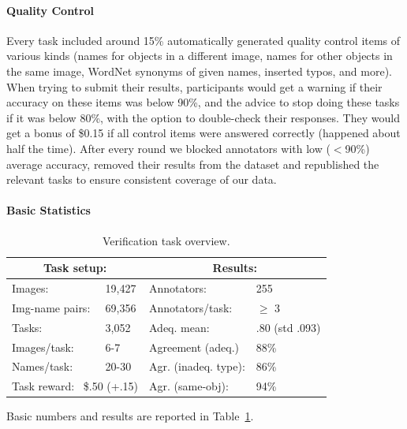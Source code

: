 \documentclass[11pt,a4paper]{article}
\begin{document}
\paragraph{Quality Control}
Every task included around 15\% automatically generated quality control items of various kinds (names for objects in a different image, names for other objects in the same image, WordNet synonyms of given names, inserted typos, and more).
When trying to submit their results, participants would get a warning if their accuracy on these items was below 90\%, and the advice to stop doing these tasks if it was below 80\%, with the option to double-check their responses.
They would get a bonus of \$0.15 if all control items were answered correctly (happened about half the time).
After every round we blocked annotators with low ($<$90\%) average accuracy, removed their results from the dataset and republished the relevant tasks to ensure consistent coverage of our data.

\paragraph{Basic Statistics}
\begin{table}[t]
	\centering
	\small
	\begin{tabular}{|ll|ll|}
		\hline
		\multicolumn{2}{|c|}{\textbf{Task setup:}} & \multicolumn{2}{c|}{\textbf{Results:}} \\ \hline
		Images: & 19,427 &
		Annotators: & 255 \\
		Img-name pairs: & 69,356 &
		Annotators/task: & $\geq$ 3 \\
		Tasks: & 3,052 &
		Adeq. mean: & \hspace{-3em}.80 (std .093)\\
		Images/task: & 6-7 &			
		Agreement (adeq.) & 88\% \\ 
		Names/task: & 20-30 &
		Agr. (inadeq. type): & 86\% \\
		\multicolumn{2}{|l|}{Task reward: \ \$.50 (+.15)} & 
		Agr. (same-obj): & 94\% \\
		\hline
	\end{tabular}
	\caption{Verification task overview. 
		\label{tab:verification-numbers}}
\end{table}
Basic numbers and results are reported in Table~\ref{tab:verification-numbers}.


\end{document}

